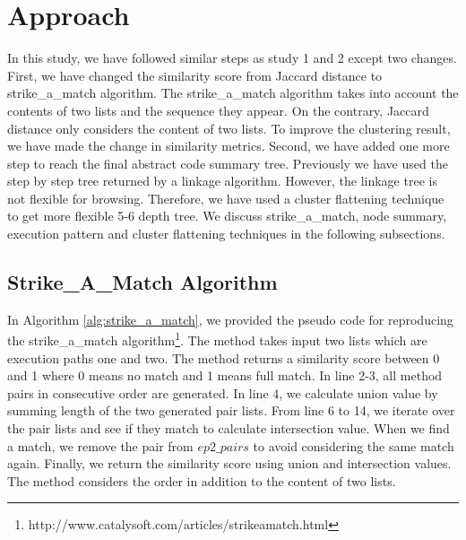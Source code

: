 \section{Approach}
\label{hla3:approach}
In this study, we have followed similar steps as study 1 and 2 except two changes. First, we have changed the similarity score from Jaccard distance to strike\_a\_match algorithm. The strike\_a\_match algorithm takes into account the contents of two lists and the sequence they appear. On the contrary, Jaccard distance only considers the content of two lists. To improve the clustering result, we have made the change in similarity metrics. Second, we have added one more step to reach the final abstract code summary tree. Previously we have used the step by step tree returned by a linkage algorithm. However, the linkage tree is not flexible for browsing. Therefore, we have used a cluster flattening technique to get more flexible 5-6 depth tree. We discuss strike\_a\_match, node summary, execution pattern and cluster flattening techniques in the following subsections. 

\subsection{Strike\_A\_Match Algorithm}
In Algorithm \ref{alg:strike_a_match}, we provided the pseudo code for reproducing the strike\_a\_match algorithm\footnote{http://www.catalysoft.com/articles/strikeamatch.html}. The method takes input two lists which are execution paths one and two. The method returns a similarity score between 0 and 1 where 0 means no match and 1 means full match. In line 2-3, all method pairs in consecutive order are generated. In line 4, we calculate union value by summing length of the two generated pair lists. From line 6 to 14, we iterate over the pair lists and see if they match to calculate intersection value. When we find a match, we remove the pair from $ep2\_pairs$ to avoid considering the same match again. Finally, we return the similarity score using union and intersection values. The method considers the order in addition to the content of two lists. 


